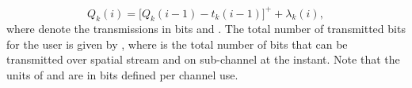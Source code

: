 \begin{equation}
Q_k(i) = \Big [ Q_k(i-1) - t_k(i-1) \Big ]^+ + \lambda_k(i),
\label{eqn-2a}
\end{equation}
where  denote the transmissions in bits and . The total number of transmitted bits for the user  is given by ,
where  is the total number of bits that can be transmitted over  spatial stream and on  sub-channel at the  instant. Note that the units of  and  are in bits defined per channel use.
